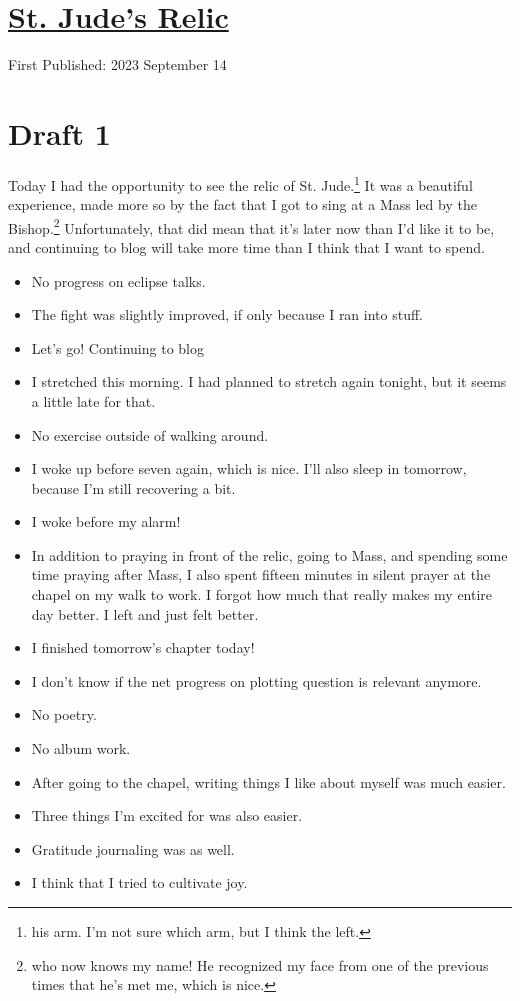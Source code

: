 \documentclass[12pt]{article}[titlepage]
\renewcommand{\,}{\textsuperscript{,}}
\begin{document}
\doublespacing
\section{\href{st-jude.html}{St. Jude's Relic}}
First Published: 2023 September 14

\section{Draft 1}
Today I had the opportunity to see the relic of St. Jude.\footnote{his arm. I'm not sure which arm, but I think the left.} 
It was a beautiful experience, made more so by the fact that I got to sing at a Mass led by the Bishop.\footnote{who now knows my name! He recognized my face from one of the previous times that he's met me, which is nice.}
Unfortunately, that did mean that it's later now than I'd like it to be, and continuing to blog will take more time than I think that I want to spend.
 
\begin{itemize}
\item No progress on eclipse talks. 
\item The fight was slightly improved, if only because I ran into stuff. 
\item Let's go! Continuing to blog 
\item I stretched this morning. I had planned to stretch again tonight, but it seems a little late for that. 
\item No exercise outside of walking around. 
\item I woke up before seven again, which is nice. I'll also sleep in tomorrow, because I'm still recovering a bit. 
\item I woke before my alarm! 
\item In addition to praying in front of the relic, going to Mass, and spending some time praying after Mass, I also spent fifteen minutes in silent prayer at the chapel on my walk to work. I forgot how much that really makes my entire day better. I left and just felt better. 
\item I finished tomorrow's chapter today! 
\item I don't know if the net progress on plotting question is relevant anymore. 
\item No poetry. 
\item No album work. 
\item After going to the chapel, writing things I like about myself was much easier.
\item Three things I'm excited for was also easier. 
\item Gratitude journaling was as well. 
\item I think that I tried to cultivate joy. 
\end{itemize}
\end{document}
